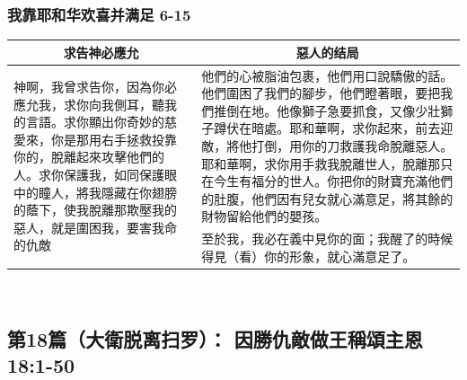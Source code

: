 \subsubsection{我靠耶和华欢喜并满足 6-15}
\begin{table}[H]
\centering
\begin{tabular}{p{5.9cm}|p{}}\hline\hline
\multicolumn{1}{c|}{求告神必應允}&\multicolumn{1}{c}{惡人的结局}\\\hline
\multirow{2}{6cm}{神啊，我曾求告你，因為你必應允我，求你向我側耳，聽我的言語。求你顯出你奇妙的慈愛來，你是那用右手拯救投靠你的，脫離起來攻擊他們的人。求你保護我，如同保護眼中的瞳人，將我隱藏在你翅膀的蔭下，使我脫離那欺壓我的惡人，就是圍困我，要害我命的仇敵}
&他們的心被脂油包裹，他們用口說驕傲的話。他們圍困了我們的腳步，他們瞪著眼，要把我們推倒在地。他像獅子急要抓食，又像少壯獅子蹲伏在暗處。耶和華啊，求你起來，前去迎敵，將他打倒，用你的刀救護我命脫離惡人。耶和華啊，求你用手救我脫離世人，脫離那只在今生有福分的世人。你把你的財寶充滿他們的肚腹，他們因有兒女就心滿意足，將其餘的財物留給他們的嬰孩。\\\cline{2-2}
&至於我，我必在義中見你的面；我醒了的時候得見（看）你的形象，就心滿意足了。\\\hline
\end{tabular}
\end{table} 



\subsection{第18篇（大衛脱离扫罗）： 因勝仇敵做王稱頌主恩 18:1-50}
